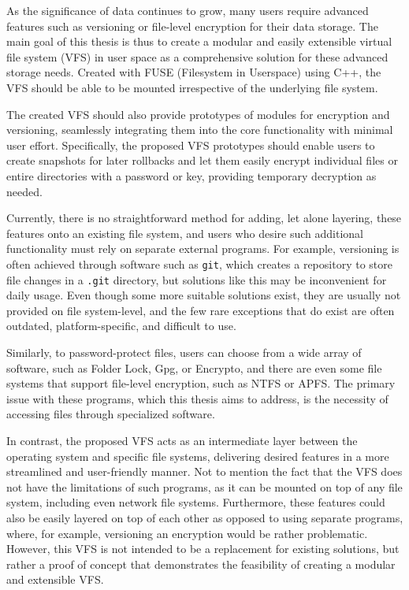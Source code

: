 
As the significance of data continues to grow, many users require advanced features such as versioning or file-level encryption for their data storage.
The main goal of this thesis is thus to create a modular and easily extensible virtual file system (VFS) in user space as a comprehensive solution for these advanced storage needs.
Created with FUSE (Filesystem in Userspace) using C++, the VFS should be able to be mounted irrespective of the underlying file system.

The created VFS should also provide prototypes of modules for encryption and versioning, seamlessly integrating them into the core functionality with minimal user effort.
Specifically, the proposed VFS prototypes should enable users to create snapshots for later rollbacks and let them easily encrypt individual files or entire directories with a password or key, providing temporary decryption as needed.

Currently, there is no straightforward method for adding, let alone layering, these features onto an existing file system, and users who desire such additional functionality must rely on separate external programs.
For example, versioning is often achieved through software such as \texttt{git}, which creates a repository to store file changes in a \texttt{.git} directory, but solutions like this may be inconvenient for daily usage.
Even though some more suitable solutions exist, they are usually not provided on file system-level, and the few rare exceptions that do exist are often outdated, platform-specific, and difficult to use.

Similarly, to password-protect files, users can choose from a wide array of software, such as Folder Lock, Gpg, or Encrypto, and there are even some file systems that support file-level encryption, such as NTFS or APFS\@.
The primary issue with these programs, which this thesis aims to address, is the necessity of accessing files through specialized software.

In contrast, the proposed VFS acts as an intermediate layer between the operating system and specific file systems, delivering desired features in a more streamlined and user-friendly manner.
Not to mention the fact that the VFS does not have the limitations of such programs, as it can be mounted on top of any file system, including even network file systems.
Furthermore, these features could also be easily layered on top of each other as opposed to using separate programs, where, for example, versioning an encryption would be rather problematic.
However, this VFS is not intended to be a replacement for existing solutions, but rather a proof of concept that demonstrates the feasibility of creating a modular and extensible VFS\@.

